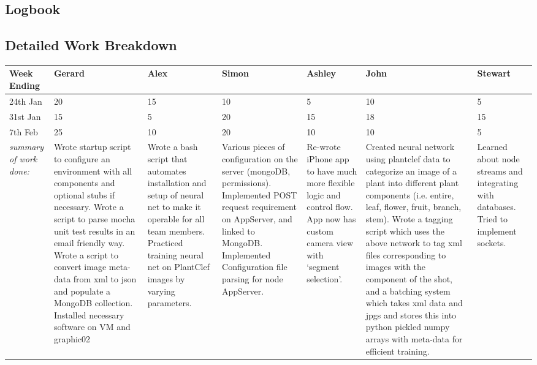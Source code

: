 \documentclass[a4paper,11pt]{article}
\begin{document}
\begin{landscape}


\section{Logbook}

\subsection{Detailed Work Breakdown}

\small
\setlength\LTleft{0pt}            %
\setlength\LTright{0pt}           %
\noindent
\begin{longtable}
	{| p{1.5cm} | p{3cm} | p{3cm} | p{3cm} | p{3cm} | p{3cm} | p{3cm} | } \\ \hline
	Week Ending & Gerard & Alex & Simon & Ashley & John & Stewart \\ \hline
	24th Jan & 20 & 15 & 10 & 5 & 10 & 5 \\ \hline 
	31st Jan & 15 & 5 & 20 & 15 & 18 & 15 \\ \hline 
	7th Feb & 25 & 10 & 20 & 10 & 10 & 5 \\ \hline
	\textit{summary of work done:}
		& Wrote startup script to configure an environment with all components and optional stubs if necessary. Wrote a script to parse mocha unit test results in an email friendly way. Wrote a script to convert image meta-data from xml to json and populate a MongoDB collection. Installed necessary software on VM and graphic02	
		& Wrote a bash script that automates installation and setup of neural net to make it operable for all team members. Practiced training neural net on PlantClef images by varying parameters.	
		& Various pieces of configuration on the server (mongoDB, permissions). Implemented POST request requirement on AppServer, and linked to MongoDB. Implemented Configuration file parsing for node AppServer.	
		& Re-wrote iPhone app to have much more flexible logic and control flow. App now has custom camera view with `segment selection'.
		& Created neural network using plantclef data to categorize an image of a plant into different plant components (i.e. entire, leaf, flower, fruit, branch, stem). Wrote a tagging script which uses the above network to tag xml files corresponding to images with the component of the shot, and a batching system which takes xml data and jpgs and stores this into python pickled numpy arrays with meta-data for efficient training.	
		& Learned about node streams and integrating with databases. Tried to implement sockets. 

\end{longtable}
\end{landscape}
\end{document}
